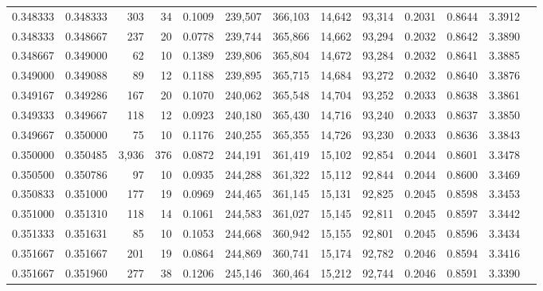 \begin{tabular}{rrrrrrrrrrrrr}
0.348333 & 0.348333 &   303 &  34 &                                     0.1009 & 239,507 & 366,103 &  14,642 &  93,314 & 0.2031 & 0.8644 & 3.3912 \\
0.348333 & 0.348667 &   237 &  20 &                                     0.0778 & 239,744 & 365,866 &  14,662 &  93,294 & 0.2032 & 0.8642 & 3.3890 \\
0.348667 & 0.349000 &    62 &  10 &                                     0.1389 & 239,806 & 365,804 &  14,672 &  93,284 & 0.2032 & 0.8641 & 3.3885 \\
0.349000 & 0.349088 &    89 &  12 &                                     0.1188 & 239,895 & 365,715 &  14,684 &  93,272 & 0.2032 & 0.8640 & 3.3876 \\
0.349167 & 0.349286 &   167 &  20 &                                     0.1070 & 240,062 & 365,548 &  14,704 &  93,252 & 0.2033 & 0.8638 & 3.3861 \\
0.349333 & 0.349667 &   118 &  12 &                                     0.0923 & 240,180 & 365,430 &  14,716 &  93,240 & 0.2033 & 0.8637 & 3.3850 \\
0.349667 & 0.350000 &    75 &  10 &                                     0.1176 & 240,255 & 365,355 &  14,726 &  93,230 & 0.2033 & 0.8636 & 3.3843 \\
0.350000 & 0.350485 & 3,936 & 376 &                                     0.0872 & 244,191 & 361,419 &  15,102 &  92,854 & 0.2044 & 0.8601 & 3.3478 \\
0.350500 & 0.350786 &    97 &  10 &                                     0.0935 & 244,288 & 361,322 &  15,112 &  92,844 & 0.2044 & 0.8600 & 3.3469 \\
0.350833 & 0.351000 &   177 &  19 &                                     0.0969 & 244,465 & 361,145 &  15,131 &  92,825 & 0.2045 & 0.8598 & 3.3453 \\
0.351000 & 0.351310 &   118 &  14 &                                     0.1061 & 244,583 & 361,027 &  15,145 &  92,811 & 0.2045 & 0.8597 & 3.3442 \\
0.351333 & 0.351631 &    85 &  10 &                                     0.1053 & 244,668 & 360,942 &  15,155 &  92,801 & 0.2045 & 0.8596 & 3.3434 \\
0.351667 & 0.351667 &   201 &  19 &                                     0.0864 & 244,869 & 360,741 &  15,174 &  92,782 & 0.2046 & 0.8594 & 3.3416 \\
0.351667 & 0.351960 &   277 &  38 &                                     0.1206 & 245,146 & 360,464 &  15,212 &  92,744 & 0.2046 & 0.8591 & 3.3390 \\

\end{tabular}
